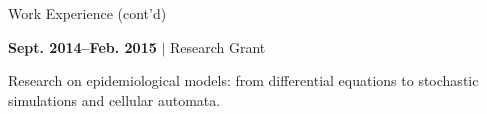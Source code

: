 \documentclass[11pt]{article}
\begin{document}

\newpage
\centerline{\sc\large Work Experience (cont'd)}
\begin{multicols}{2}
\setlength{\columnseprule}{0.4pt}
\begin{samepage}\textbf{Sept. 2014--Feb. 2015} $\vert$ Research Grant
\\\begin{adjustwidth}{1.5em}{}%
\footnotesize
Research on epidemiological models: from differential equations to stochastic simulations and cellular automata.\par\end{adjustwidth}
\end{samepage}
\end{multicols}

\end{document}

